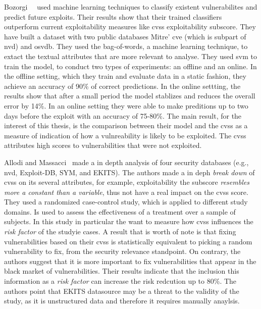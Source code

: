 Bozorgi~\etal{}~\cite{Bozorgi:2010} used machine learning techniques to classify existent vulnerabilites and predict future exploits.
Their results show that their trained classifiers outperform current exploitability measures like \gls{cvss} exploitability subscore.
They have built a dataset with two public databases Mitre' \gls{cve} (which is subpart of \gls{nvd}) and \gls{osvdb}.
They used the bag-of-words, a machine learning technique, to extact the textual attributes that are more relevant to analyse.
They used \gls{svm} to train the model, to conduct two types of experiments: an offline and an online.
In the offline setting, which they train and evaluate data in a static fashion, they achieve an accuracy of 90\% of correct predictions.
In the online settting, the results show that after a small period the model stablizes and reduces the overall error by 14\%.
In an online setting they were able to make preditions up to two days before the exploit with an accuracy of 75-80\%.
The main result, for the interest of this thesis, is the comparison between their model and the \gls{cvss} as a measure of indication of how a vulnreability is likely to be exploited.
The \gls{cvss} attributes high scores to vulnerabilities that were not exploited. 

Allodi and Massacci~\cite{Allodi:2014} made a in depth analysis of four security databases (e.g., \gls{nvd}, Exploit-DB, SYM, and EKITS). 
The authors made a in deph \emph{break down} of \gls{cvss} on its several attributes, for example, exploitability the subscore \emph{resembles more a constant than a variable}, thus not have a real impact on the \gls{cvss} score.
They used a randomized case-control study, which is applied to different study domains.
Is used to assess the effectiveness of a treatment over a sample of subjects.
In this study in particular the want to measure how \gls{cvss} influences the \emph{risk factor} of the studyie cases.
A result that is worth of note is that fixing vulnerabilities based on their \gls{cvss} is statistically equivalent to picking a random vulnerability to fix, from the security relevance standpoint.
On contrary, the authors suggest that it is more important to fix vulnerabilities that appear in the black market of vulnerabilities.
Their results indicate that the inclusion this information as a \emph{risk factor} can increase the risk redcution up to 80\%.
The authors point that EKITS datasource may be a threat to the validity of the study, as it is unstructured data and therefore it requires manually anaylsis.

